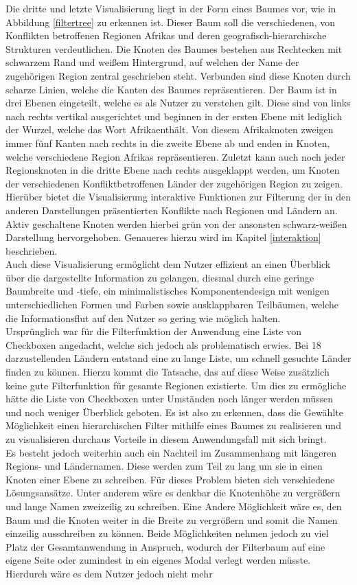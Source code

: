 \documentclass[usegeometry=true]{scrartcl}
\begin{document}
Die dritte und letzte Visualisierung liegt in der Form eines Baumes vor, wie in Abbildung \ref{filtertree} zu erkennen ist. Dieser Baum soll die verschiedenen, von Konflikten betroffenen Regionen Afrikas und deren geografisch-hierarchische Strukturen verdeutlichen. Die Knoten des Baumes bestehen aus Rechtecken mit schwarzem Rand und weißem Hintergrund, auf welchen der Name der zugehörigen Region zentral geschrieben steht. Verbunden sind diese Knoten durch scharze Linien, welche die Kanten des Baumes repräsentieren. Der Baum ist in drei Ebenen eingeteilt, welche es als Nutzer zu verstehen gilt. Diese sind von links nach rechts vertikal ausgerichtet und beginnen in der ersten Ebene mit lediglich der Wurzel, welche das Wort \glqq Afrika\grqq enthält. Von diesem Afrikaknoten zweigen immer fünf Kanten nach rechts in die zweite Ebene ab und enden in Knoten, welche verschiedene Region Afrikas repräsentieren. Zuletzt kann auch noch jeder Regionsknoten in die dritte Ebene nach rechts ausgeklappt werden, um Knoten der verschiedenen Konfliktbetroffenen Länder der zugehörigen Region zu zeigen. Hierüber bietet die Visualisierung interaktive Funktionen zur Filterung der in den anderen Darstellungen präsentierten Konflikte nach Regionen und Ländern an. Aktiv geschaltene Knoten werden hierbei grün von der ansonsten schwarz-weißen Darstellung hervorgehoben. Genaueres hierzu wird im Kapitel \ref{interaktion} beschrieben.\\ Auch diese Visualisierung ermöglicht dem Nutzer effizient an einen Überblick über die dargestellte Information zu gelangen, diesmal durch eine geringe Baumbreite und -tiefe, ein minimalistisches Komponentendesign mit wenigen unterschiedlichen Formen und Farben sowie ausklappbaren Teilbäumen, welche die Informationsflut auf den Nutzer so gering wie möglich halten.\\ Ursprünglich war für die Filterfunktion der Anwendung eine Liste von Checkboxen angedacht, welche sich jedoch als problematisch erwies. Bei 18 darzustellenden Ländern entstand eine zu lange Liste, um schnell gesuchte Länder finden zu können. Hierzu kommt die Tatsache, das auf diese Weise zusätzlich keine gute Filterfunktion für gesamte Regionen existierte. Um dies zu ermögliche hätte die Liste von Checkboxen unter Umständen noch länger werden müssen und noch weniger Überblick geboten. Es ist also zu erkennen, dass die Gewählte Möglichkeit einen hierarchischen Filter mithilfe eines Baumes zu realisieren und zu visualisieren durchaus Vorteile in diesem Anwendungsfall mit sich bringt.\\ Es besteht jedoch weiterhin auch ein Nachteil im Zusammenhang mit längeren Regions- und Ländernamen. Diese werden zum Teil zu lang um sie in einen Knoten einer Ebene zu schreiben. Für dieses Problem bieten sich verschiedene Lösungsansätze. Unter anderem wäre es denkbar die Knotenhöhe zu vergrößern und lange Namen zweizeilig zu schreiben. Eine Andere Möglichkeit wäre es, den Baum und die Knoten weiter in die Breite zu vergrößern und somit die Namen einzeilig ausschreiben zu können. Beide Möglichkeiten nehmen jedoch zu viel Platz der Gesamtanwendung in Anspruch, wodurch der Filterbaum auf eine eigene Seite oder zumindest in ein eigenes Modal verlegt werden müsste. Hierdurch wäre es dem Nutzer jedoch nicht mehr 
\end{document}
